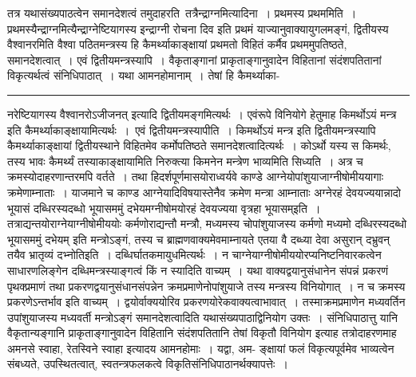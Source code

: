 \documentclass[11pt, openany]{book}
\makeatletter
\def\blfootnote{\gdef\@thefnmark{}\@footnotetext}
\makeatother
\begin{document}
 तत्र यथासंख्यपाठत्वेन समानदेशत्वं तमुदाहरति\textendash\ {\br तत्रैन्द्राग्नमित्यादिना~। प्रथमस्य प्रथममिति~।} प्रथमस्यैन्द्राग्नमित्यैन्द्राग्नेष्टियागस्य {\qt इन्द्राग्नी रोचना दिव} इति प्रथमं याज्यानुवाक्यायुगलमङ्गं, द्वितीयस्य वैश्वानरमिति वैश्वा
\blfootnote{पाठा०\textemdash\ $^{१}$विदेवनादया.}
\newpage
\fancyhead[RE]{[ पाठसादेश्येन विनि० ]}
{\bl\noindent पठितमन्त्रस्य हि कैमर्थ्याकाङ्क्षायां प्रथमतो विहितं कर्मैव प्रथममुपतिष्ठते, समानदेशत्वात्~। एवं द्वितीयमन्त्रस्यापि~। वैकृताङ्गानां प्राकृताङ्गानुवादेन विहितानां संदंशपतितानां विकृत्यर्थत्वं संनिधिपाठात्~। यथा {\qtl आमनहोमानाम्~}। तेषां हि कैमर्थ्याका-\\}
\hrule
\vspace{3mm}
\noindent
नरेष्टियागस्य {\qt वैश्वानरोऽजीजनत्} इत्यादि द्वितीयमङ्गमित्यर्थः~। एवंरूपे विनियोगे हेतुमाह किमर्थोऽयं मन्त्र इति कैमर्थ्याकाङ्क्षायामित्यर्थः~।~{\br एवं द्वितीयमन्त्रस्यापीति~।} किमर्थोऽयं मन्त्र इति द्वितीयमन्त्रस्यापि कैमर्थ्याकाङ्क्षायां द्वितीयस्थाने विहितमेव कर्मोपतिष्ठते समानदेशत्वादित्यर्थः~। कोऽर्थो यस्य स किमर्थः, तस्य भावः कैमर्थ्यं तस्याकाङ्क्षायामिति निरुक्त्या किमनेन मन्त्रेण भाव्यमिति सिध्यति~। अत्र च क्रमस्योदाहरणान्तरमपि वर्तते~। तथा हि\textendash दर्शपूर्णमासयोराध्वर्यवे काण्डे आग्नेयोपांशुयाजाग्नीषोमीययागाः क्रमेणाम्नाताः~। याजमाने च काण्ड आग्नेयादिविषयास्तेनैव क्रमेण मन्त्रा आम्नाताः {\qt अग्नेरहं देवयज्ययान्नादो भूयासं दब्धिरस्यदब्धो भूयासममुं दभेयमग्नीषोमयोरहं देवयज्यया वृत्रहा भूयासम्}इति~।
तत्राद्यन्तयोराग्नेयाग्नीषोमीययोः कर्मणोराद्यन्तौ मन्त्रौ, मध्यमस्य चोपांशुयाजस्य कर्मणो मध्यमो {\qt दब्धिरस्यदब्धो भूयासममुं दभेयम्} इति मन्त्रोऽङ्गं, तस्य च ब्राह्मणवाक्यमेवमाम्नायते {\qt एतया वै दब्ध्या देवा असुरान् दभ्रुवन् तयैव भ्रातृव्यं दभ्नोति}इति~। दब्धिर्घातकमायुधमित्यर्थः~। न चाग्नेयाग्नीषोमीययोरप्यनिष्टनिवारकत्वेन साधारणलिङ्गेन दब्धिमन्त्रस्याङ्गत्वं किं न स्यादिति वाच्यम्~। यथा वाक्यद्वयानुसंधानेन संपन्नं प्रकरणं पृथक्प्रमाणं तथा प्रकरणद्वयानुसंधानसंपन्नेन क्रमप्रमाणेनोपांशुयाजे तस्य मन्त्रस्य विनियोगात्~। न च क्रमस्य प्रकरणेऽन्तर्भाव इति वाच्यम्~। द्वयोर्वाक्ययोरिव प्रकरणयोरेकवाक्यत्वाभावात्~। तस्माक्रमप्रमाणेन मध्यवर्तिन उपांशुयाजस्य
मध्यवर्ती मन्त्रोऽङ्गं समानदेशत्वादिति यथासंख्यपाठाद्विनियोग उक्तः~। संनिधिपाठात्तु यानि वैकृतान्यङ्गानि प्राकृताङ्गानुवादेन विहितानि संदंशपतितानि तेषां विकृतौ विनियोग इत्याह तत्रोदाहरणमाह {\qt अमनसे स्वाहा, रेतस्विने स्वाहा} इत्यादय आमनहोमाः~। यद्वा, {\qt अम}- 
\newpage
\fancyhead[LO]{[अनु०सा०विनियोग ]}
{\bl\noindent ङ्क्षायां फलं विकृत्यपूर्वमेव भाव्यत्वेन संबध्यते, उपस्थितत्वात्, स्वतन्त्रफलकत्वे विकृतिसंनिधिपाठानर्थक्यापत्तेः~।}\\
\end{document}
